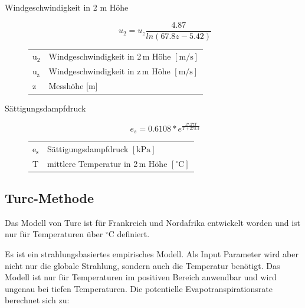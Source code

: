 \begin{description}
\item[Windgeschwindigkeit in 2 m Höhe]
\begin{equation}
\label{eq:u2}
u_2=u_z\frac{4.87}{ln(67.8z-5.42)}
\end{equation}
\begin{table}[H]
\centering
\begin{tabular}{ll}
$\mathrm{u_2}$ & Windgeschwindigkeit in 2\,m Höhe $\mathrm{[m/s]}$\\
$\mathrm{u_z}$ & Windgeschwindigkeit in z\,m Höhe $\mathrm{[m/s]}$\\
z & Messhöhe [m]\\
\end{tabular}
\end{table}

\item[Sättigungsdampfdruck]
\begin{equation}
\label{eq:es}
e_s=0.6108*e^{\frac{17.27T}{T+273.3}}
\end{equation}
\begin{table}[H]
\centering
\begin{tabular}{ll}
$\mathrm{e_s}$ & Sättigungsdampfdruck $\mathrm{[kPa]}$\\
T & mittlere Temperatur in 2\,m Höhe $\mathrm{[^{\circ}C]}$\\\end{tabular}
\end{table}

\end{description}

\subsection{Turc-Methode}
Das Modell von Turc ist für Frankreich und Nordafrika entwickelt worden und ist nur für Temperaturen über $\mathrm{^{\circ}C}$ definiert.

Es ist ein strahlungsbasiertes empirisches Modell. Als Input Parameter wird aber nicht nur die globale Strahlung, sondern auch die Temperatur benötigt. Das Modell ist nur für Temperaturen im positiven Bereich anwendbar und wird ungenau bei tiefen Temperaturen. Die potentielle Evapotranspirationsrate berechnet sich zu:

